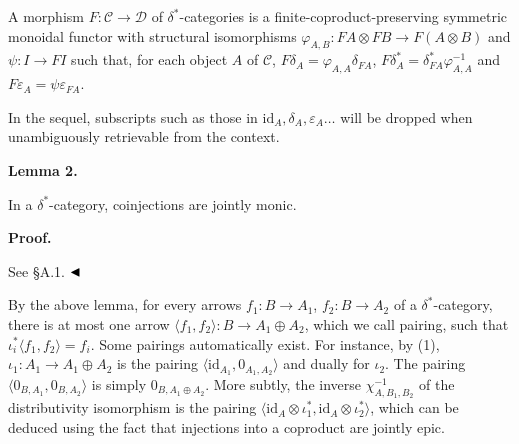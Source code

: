  
 
A morphism $F:\mathcal{C}\to\mathcal{D}$ of $\delta^{\ast}$-categories is a finite-coproduct-preserving symmetric monoidal functor with structural isomorphisms $\varphi_{A,B}:FA\otimes FB\to F(A\otimes B)$ and $\psi:I\to FI$ such that, for each object $A$ of $\mathcal{C}$, $F\delta_{A}=\varphi_{A,A}\delta_{FA}$, $F\delta^{\ast}_{A}=\delta^{\ast}_{FA}\varphi^{-1}_{A,A}$ and $F\varepsilon_{A}=\psi\varepsilon_{FA}$.\par
 
 
 
 
In the sequel, subscripts such as those in $\mathrm{id}_{A},\delta_{A},\varepsilon_{A}\ldots$ will be dropped when unambiguously retrievable from the context.\par
 
 
 
\par\medskip\noindent\textbf{Lemma 2.}\par
 
 
In a $\delta^{\ast}$-category, coinjections are jointly monic.\par
 
 
 
 
\par\medskip\noindent\textbf{Proof.}\par
 
 
See §A.1. $\hfill\blacktriangleleft$\par
 
 
 
By the above lemma, for every arrows $f_{1}:B\to A_{1}$, $f_{2}:B\to A_{2}$ of a $\delta^{\ast}$-category, there is at most one arrow $\langle f_{1},f_{2}\rangle:B\to A_{1}\oplus A_{2}$, which we call pairing, such that $\iota^{\ast}_{i}\langle f_{1},f_{2}\rangle=f_{i}$. Some pairings automatically exist. For instance, by (1), $\iota_{1}:A_{1}\to A_{1}\oplus A_{2}$ is the pairing $\langle\mathrm{id}_{A_{1}},0_{A_{1},A_{2}}\rangle$ and dually for $\iota_{2}$. The pairing $\langle 0_{B,A_{1}},0_{B,A_{2}}\rangle$ is simply $0_{B,A_{1}\oplus A_{2}}$. More subtly, the inverse $\chi^{-1}_{A,B_{1},B_{2}}$ of the distributivity isomorphism is the pairing $\langle\mathrm{id}_{A}\otimes\iota^{*}_{1},\mathrm{id}_{A}\otimes\iota^{*}_{2}\rangle$, which can be deduced using the fact that injections into a coproduct are jointly epic.\par
 
